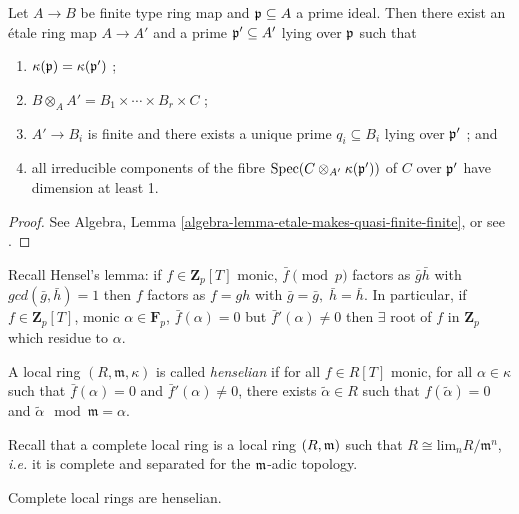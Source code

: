 \begin{theorem}
\label{theorem-quasi-finite-etale-locally}
Let $A\to B$ be finite type ring map and $\frak p \subseteq A$ a prime ideal.
Then there exist an \'etale ring map $A \to A'$ and a prime $\frak p' \subseteq
A'$ lying over $\frak p$ such that
\begin{enumerate}
\item
$\kappa(\frak p) = \kappa(\frak p')$ ;
\item
$ B \otimes_A A' = B_1\times \cdots \times B_r \times C$ ;
\item
$ A'\to B_i$ is finite and there exists a unique prime $q_i\subseteq B_i$ lying
over $\frak p'$ ; and
\item
all irreducible components of the fibre $\text{Spec}(C\otimes_{A'} \kappa(\frak
p'))$ of $C$ over $\frak p'$ have dimension at least 1.
\end{enumerate}
\end{theorem}

\begin{proof}
See Algebra, Lemma \ref{algebra-lemma-etale-makes-quasi-finite-finite}, or
see \cite[Th\'eor\`eme 18.12.1]{EGA4}.
\end{proof}

\noindent
Recall Hensel's lemma: if $f\in \mathbf{Z}_p[T]$ monic, $\bar{f}\pmod{p}$
factors as $\bar g\bar h$ with $gcd(\bar{g}, \bar{h})=1$ then $f$ factors
as $f = gh$ with $\bar{g}=\bar{g}, \; \bar{h}=\bar{h}$.
In particular, if $f \in \mathbf{Z}_p[T]$, monic
$\alpha\in \mathbf{F}_p$, $\bar f(\alpha) =0$ but $\bar f'(\alpha)\neq 0$
then $\exists $ root of $f$ in $\mathbf{Z}_p$ which residue to $\alpha$.


\begin{definition}
\label{definition-henselian}
A local ring $(R, \mathfrak m, \kappa)$ is called {\it henselian} if for all
$f\in R[T]$ monic, for all $\alpha\in \kappa$ such that $\bar f(\alpha)=0$ and
$\bar f'(\alpha)\neq 0$, there exists $\tilde\alpha\in R$ such that
$f(\tilde\alpha) = 0$ and $\tilde\alpha\mod\mathfrak m = \alpha$.
\end{definition}

\noindent
Recall that a complete local ring is a local ring $(R, \frak m)$ such that
$R\cong \text{lim}_n R/\mathfrak m^n$, {\it i.e.} it is complete and separated
for the $\frak m$-adic topology.

\begin{theorem}
\label{theorem-hensel}
Complete local rings are henselian.
\end{theorem}


